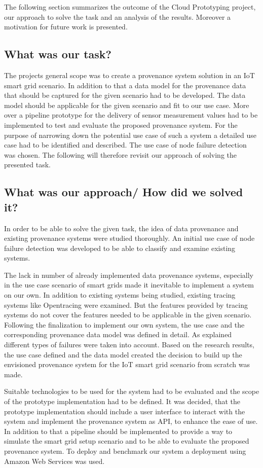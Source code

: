
The following section summarizes the outcome of the Cloud Prototyping project, our approach to solve the task and an analysis of the results. Moreover a motivation for future work is presented.
\subsection{What was our task?}
The projects general scope was to create a provenance system solution in an IoT smart grid scenario. In addition to that a data model for the provenance data that should be captured for the given scenario had to be developed. The data model should be applicable for the given scenario and fit to our use case. More over a pipeline prototype for the delivery of sensor measurement values had to be implemented to test and evaluate the proposed provenance system.
For the purpose of narrowing down the potential use case of such a system a detailed use case had to be identified and described. The use case of node failure detection was chosen.
The following will therefore revisit our approach of solving the presented task.
\subsection{What was our approach/ How did we solved it?}
In order to be able to solve the given task, the idea of data provenance and existing provenance systems were studied thoroughly. An initial use case of node failure detection was developed to be able to classify and examine existing systems. 

The lack in number of already implemented data provenance systems, especially in the use case scenario of smart grids made it inevitable to implement a system on our own. In addition to existing systems being studied, existing tracing systems like Opentracing were examined. But the features provided by tracing systems do not cover the features needed to be applicable in the given scenario. Following the finalization to implement our own system, the use case and the corresponding provenance data model was defined in detail. As explained different types of failures were taken into account. Based on the research results, the use case defined and the data model created the decision to build up the envisioned provenance system for the IoT smart grid scenario from scratch was made. 

Suitable technologies to be used for the system had to be evaluated and the scope of the prototype implementation had to be defined. It was decided, that the prototype implementation should include a user interface to interact with the system and implement the provenance system as API, to enhance the ease of use. In addition to that a pipeline should be implemented to provide a way to simulate the smart grid setup scenario and to be able to evaluate the proposed provenance system. To deploy and benchmark our system a deployment using Amazon Web Services was used. 

